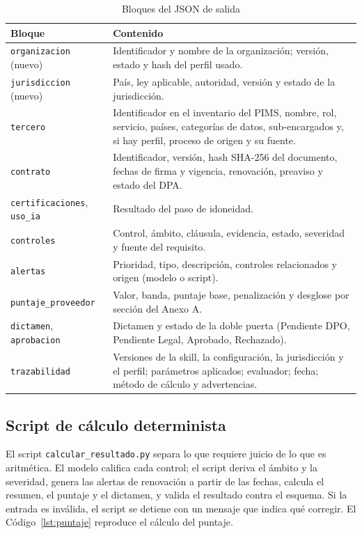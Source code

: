 \documentclass[12pt,letterpaper]{article}
\begin{document}
\begin{table}[H]
\centering
\small
\caption{Bloques del JSON de salida}
\label{tab:json}
\begin{tabularx}{\linewidth}{@{}L{3.5cm} Y@{}}
\toprule
\textbf{Bloque} & \textbf{Contenido} \\
\midrule
\texttt{organizacion} (nuevo) & Identificador y nombre de la organización; versión, estado y hash del perfil usado. \\
\texttt{jurisdiccion} (nuevo) & País, ley aplicable, autoridad, versión y estado de la jurisdicción. \\
\texttt{tercero} & Identificador en el inventario del PIMS, nombre, rol, servicio, países, categorías de datos, sub-encargados y, si hay perfil, proceso de origen y su fuente. \\
\texttt{contrato} & Identificador, versión, hash SHA-256 del documento, fechas de firma y vigencia, renovación, preaviso y estado del DPA. \\
\texttt{certificaciones}, \texttt{uso\_ia} & Resultado del paso de idoneidad. \\
\texttt{controles} & Control, ámbito, cláusula, evidencia, estado, severidad y fuente del requisito. \\
\texttt{alertas} & Prioridad, tipo, descripción, controles relacionados y origen (modelo o script). \\
\texttt{puntaje\_proveedor} & Valor, banda, puntaje base, penalización y desglose por sección del Anexo A. \\
\texttt{dictamen}, \texttt{aprobacion} & Dictamen y estado de la doble puerta (Pendiente DPO, Pendiente Legal, Aprobado, Rechazado). \\
\texttt{trazabilidad} & Versiones de la skill, la configuración, la jurisdicción y el perfil; parámetros aplicados; evaluador; fecha; método de cálculo y advertencias. \\
\bottomrule
\end{tabularx}
\end{table}

\subsection{Script de cálculo determinista}

El script \texttt{calcular\_resultado.py} separa lo que requiere juicio de lo que es aritmética. El modelo califica cada control; el script deriva el ámbito y la severidad, genera las alertas de renovación a partir de las fechas, calcula el resumen, el puntaje y el dictamen, y valida el resultado contra el esquema. Si la entrada es inválida, el script se detiene con un mensaje que indica qué corregir. El Código~\ref{lst:puntaje} reproduce el cálculo del puntaje.
\end{document}
